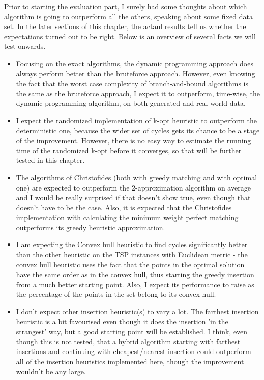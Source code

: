 \documentclass[12pt,twoside,notitlepage]{report}
\begin{document}
Prior to starting the evaluation part, I surely had some thoughts about which algorithm is going to outperform all the others, speaking about some fixed data set. In the later sections of this chapter, the actaul results tell us whether the expectations turned out to be right. Below is an overview of several facts we will test onwards.

\begin{itemize}

\item Focusing on the exact algorithms, the dynamic programming approach does always perform better than the bruteforce approach. However, even knowing the fact that the worst case complexity of branch-and-bound algorithms is the same as the bruteforce approach, I expect it to outperform, time-wise, the dynamic programming algorithm, on both generated and real-world data.

\item I expect the randomized implementation of k-opt heuristic to outperform the deterministic one, because the wider set of cycles gets its chance to be a stage of the improvement. However, there is no easy way to estimate the running time of the randomized k-opt before it converges, so that will be further tested in this chapter. 

\item The algorithms of Christofides (both with greedy matching and with optimal one) are expected to outperform the 2-approximation algorithm on average and I would be really surprised if that doesn't show true, even though that doesn't have to be the case. Also, it is expected that the Christofides implementation with calculating the minimum weight perfect matching outperforms its greedy heuristic approximation.

\item I am expecting the Convex hull heuristic to find cycles significantly better than the other heuristic on the TSP instances with Euclidean metric - the convex hull heuristic uses the fact that the points in the optimal solution have the same order as in the convex hull, thus starting the greedy insertion from a much better starting point. Also, I expect its performance to raise as the percentage of the points in the set belong to its convex hull.

\item I don't expect other insertion heuristic(s) to vary a lot. The farthest insertion heuristic is a bit favourised even though it does the insertion 'in the strangest' way, but a good starting point will be established. I think, even though this is not tested, that a hybrid algorithm starting with farthest insertions and continuing with cheapest/nearest insertion could outperform all of the insertion heuristics implemented here, though the improvement wouldn't be any large.


\end{itemize}
\end{document}
